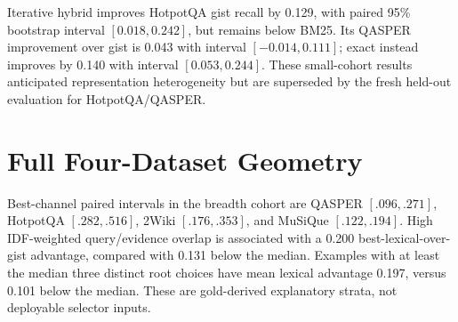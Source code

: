 \documentclass[11pt]{article}
\begin{document}
\begin{table}[H]
\centering
\scriptsize
\caption{Original held-out discovery. R/P/M are supporting-evidence recall, precision, and MRR. B0--H5 request four chunks; A1 requests eight.}
\end{table}

Iterative hybrid improves HotpotQA gist recall by 0.129, with paired 95\% bootstrap interval $[0.018,0.242]$, but remains below BM25. Its QASPER improvement over gist is 0.043 with interval $[-0.014,0.111]$; exact instead improves by 0.140 with interval $[0.053,0.244]$. These small-cohort results anticipated representation heterogeneity but are superseded by the fresh held-out evaluation for HotpotQA/QASPER.

\section{Full Four-Dataset Geometry}
\label{app:geometry}
Best-channel paired intervals in the breadth cohort are QASPER $[.096,.271]$, HotpotQA $[.282,.516]$, 2Wiki $[.176,.353]$, and MuSiQue $[.122,.194]$. High IDF-weighted query/evidence overlap is associated with a 0.200 best-lexical-over-gist advantage, compared with 0.131 below the median. Examples with at least the median three distinct root choices have mean lexical advantage 0.197, versus 0.101 below the median. These are gold-derived explanatory strata, not deployable selector inputs.
\end{document}
